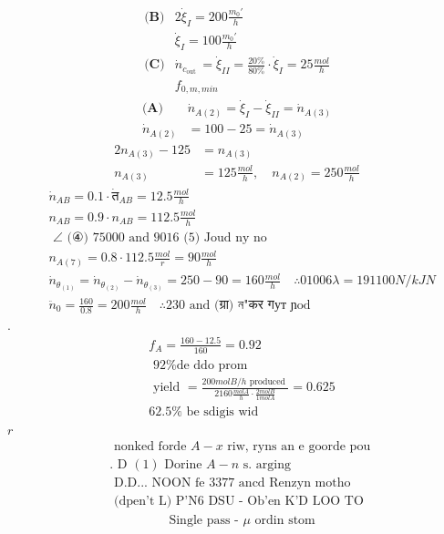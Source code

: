\documentclass[12pt]{article}
\begin{document}
\[
\begin{array}{ll}
\textbf{(B)}
& 2 \dot{\xi}_{I}=200 \frac{m_{0} \prime}{h} \\
& \dot{\xi}_{I}=100 \frac{m_{0} \prime}{h} \\
\textbf{(C)}
& \dot{n}_{c_{\text {out }}}=\dot{\xi}_{I I}=\frac{20 \%}{80 \%} \cdot \dot{\xi}_{I}=25 \frac{mol}{h} \\
& f_{0, m, min}
\end{array}
\]
\[
\begin{aligned}
\textbf{(A)}
& \dot{n}_{A(2)}=\dot{\xi}_{I}-\dot{\xi}_{I I}=\dot{n}_{A(3)} \\
\dot{n}_{A(2)} & =100-25=\dot{n}_{A(3)}
\end{aligned}
\]
\[
\begin{aligned}
2 n_{A(3)}-125 & =n_{A(3)} \\
n_{A(3)} & =125 \frac{mol}{h}, \quad n_{A(2)}=250 \frac{mol}{h}
\end{aligned}
\]
\[
\begin{aligned}
& \dot{n}_{A B}=0.1 \cdot \dot{त}_{A B}=12.5 \frac{mol}{h} \\
& n_{A B}=0.9 \cdot n_{A B}=112.5 \frac{mol}{h} \\
& \text { ∠ (④) 75000 and } 9016 \text { (5) Joud ny no } \\
& n_{A(7)}=0.8 \cdot 112.5 \frac{mol}{r}=90 \frac{mol}{h} \\
& \dot{n}_{\theta_{(1)}}=\dot{n}_{\theta_{(2)}}-\dot{n}_{\theta_{(3)}}=250-90=160 \frac{mol}{h} \quad \therefore 01006 \lambda=191100 N / kJN \\
& \ddot{n}_{0}=\frac{160}{0.8}=200 \frac{mol}{h} \quad \therefore 230 \text { and (ग्रा) ন"कर गут ɲod }
\end{aligned}
\]
.
\[
\begin{aligned}
& f_{A}=\frac{160-12.5}{160}=0.92 \\
& \text { 92\% de ddo prom } \\
& \text { yield }=\frac{200 mol B / h \text { produced }}{2160 \frac{mol A}{h} \cdot \frac{2 mol B}{1 mol A}}=0.625 \\
& 62.5 \% \text { be sdigis wid }
\end{aligned}
\]
\(r\)
\[
\begin{aligned}
& \text { nonked forde } A-x \text { riw, ryns an e goorde pou } \\
& \text {. D }(1) \text { Dorine } A-n \text { s. arging } \\
& \text { D.D... NOON fe } 3377 \text { ancd Renzyn motho } \\
& \text { (dpen't L) P'N6 DSU - Ob'en K'D LOO TO }
\end{aligned}
\]
\[
\begin{aligned}
& \text { Single pass - } \mu \text { ordin stom }
\end{aligned}
\]
\end{document}

